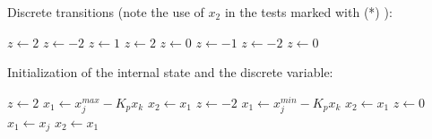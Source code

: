 \pagebreak
Discrete transitions (note the use of $x_2$ in the tests marked with (*) ):

\hspace*{20ex}\begin{minipage}[t]{15cm}
\begin{algorithmic} 
    \STATE $z \gets 2$
    \STATE $z \gets -2$
  \ENDIF
{}
    \STATE $z \gets 1$
  \ENDIF
{}
    \STATE $z \gets 2$
    \STATE $z \gets 0$
  \ENDIF
{}
    \STATE $z \gets -1$
  \ENDIF
{}
    \STATE $z \gets -2$
    \STATE $z \gets 0$
  \ENDIF  
\ENDIF
\end{algorithmic}
\end{minipage}

Initialization of the internal state and the discrete variable: 

\hspace*{20ex}\begin{minipage}[t]{15cm}
\begin{algorithmic} 
   \STATE $z \gets 2$
   \STATE $x_1 \gets x_j^{max} - K_p x_k$
   \STATE $x_2 \gets x_1$    
   \STATE $z \gets -2$
   \STATE $x_1 \gets x_j^{min} - K_p x_k$
   \STATE $x_2 \gets x_1$   
\ELSE
   \STATE $z \gets 0$
   \STATE $x_1 \gets x_j$
   \STATE $x_2 \gets x_1$  
\ENDIF
\end{algorithmic}
\end{minipage}
   